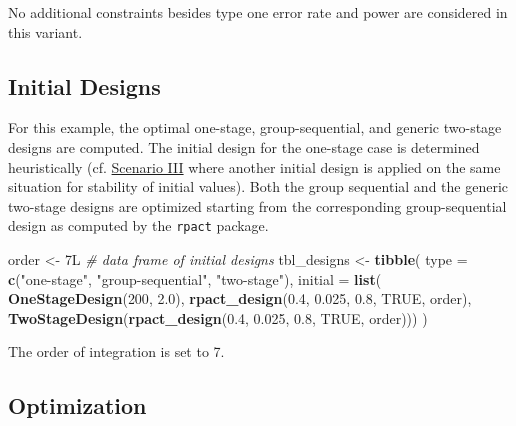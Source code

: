 \documentclass[]{book}
\newenvironment{Shaded}{\begin{snugshade}}{\end{snugshade}}
\newcommand{\CommentTok}[1]{\textcolor[rgb]{0.56,0.35,0.01}{\textit{#1}}}
\newcommand{\DataTypeTok}[1]{\textcolor[rgb]{0.13,0.29,0.53}{#1}}
\newcommand{\DecValTok}[1]{\textcolor[rgb]{0.00,0.00,0.81}{#1}}
\newcommand{\FloatTok}[1]{\textcolor[rgb]{0.00,0.00,0.81}{#1}}
\newcommand{\KeywordTok}[1]{\textcolor[rgb]{0.13,0.29,0.53}{\textbf{#1}}}
\newcommand{\NormalTok}[1]{#1}
\newcommand{\OtherTok}[1]{\textcolor[rgb]{0.56,0.35,0.01}{#1}}
\newcommand{\StringTok}[1]{\textcolor[rgb]{0.31,0.60,0.02}{#1}}
\begin{document}
No additional constraints besides type one error rate and power
are considered in this variant.

\hypertarget{initial-designs}{%
\subsection{Initial Designs}\label{initial-designs}}

For this example, the optimal one-stage, group-sequential, and generic
two-stage designs are computed.
The initial design for the one-stage case is determined heuristically
(cf. \protect\hyperlink{scenarioIII}{Scenario III} where another initial design is applied
on the same situation for stability of initial values).
Both the group sequential and the generic two-stage designs are
optimized starting from the corresponding group-sequential design as
computed by the \texttt{rpact} package.

\begin{Shaded}
\begin{Highlighting}[]
\NormalTok{order <-}\StringTok{ }\NormalTok{7L}
\CommentTok{# data frame of initial designs }
\NormalTok{tbl_designs <-}\StringTok{ }\KeywordTok{tibble}\NormalTok{(}
    \DataTypeTok{type    =} \KeywordTok{c}\NormalTok{(}\StringTok{"one-stage"}\NormalTok{, }\StringTok{"group-sequential"}\NormalTok{, }\StringTok{"two-stage"}\NormalTok{),}
    \DataTypeTok{initial =} \KeywordTok{list}\NormalTok{(}
        \KeywordTok{OneStageDesign}\NormalTok{(}\DecValTok{200}\NormalTok{, }\FloatTok{2.0}\NormalTok{),}
        \KeywordTok{rpact_design}\NormalTok{(}\FloatTok{0.4}\NormalTok{, }\FloatTok{0.025}\NormalTok{, }\FloatTok{0.8}\NormalTok{, }\OtherTok{TRUE}\NormalTok{, order),}
        \KeywordTok{TwoStageDesign}\NormalTok{(}\KeywordTok{rpact_design}\NormalTok{(}\FloatTok{0.4}\NormalTok{, }\FloatTok{0.025}\NormalTok{, }\FloatTok{0.8}\NormalTok{, }\OtherTok{TRUE}\NormalTok{, order))) )}
\end{Highlighting}
\end{Shaded}

The order of integration is set to 7.

\hypertarget{optimization}{%
\subsection{Optimization}\label{optimization}}
\end{document}
